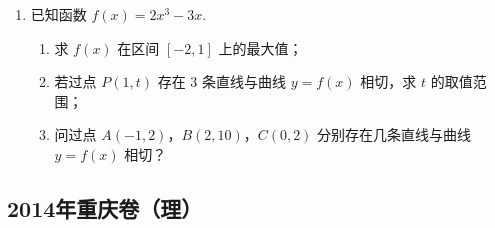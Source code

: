 \begin{description}
\begin{enumerate}[leftmargin=5pt]
        \item 已知函数 \(f(x) = 2x^{3} - 3x\).

\begin{enumerate}
\item 求 \(f(x)\) 在区间 \([-2,1]\) 上的最大值；
\item 若过点 \(P(1,t)\) 存在 3 条直线与曲线 \(y = f(x)\) 相切，求 \(t\) 的取值范围；
\item 问过点 \(A(-1,2)\)，\(B(2,10)\)，\(C(0,2)\) 分别存在几条直线与曲线 \(y = f(x)\) 相切？
\end{enumerate}

    \end{enumerate}

\end{description}


\subsection{2014年重庆卷（理）}\label{gk:2014年重庆卷（理）}

